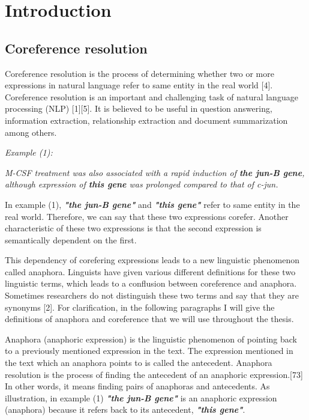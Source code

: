 \chapter{Introduction}
\label{chapter:Introduction}
\section{Coreference resolution}

Coreference resolution is the process of determining whether two or more expressions in natural language refer to same entity in the real world [4]. Coreference resolution is an important and challenging task of natural language processing (NLP) [1][5]. It is believed to be useful in question answering, information extraction, relationship extraction and document summarization among others. \vspace{5mm}
  
\emph{Example (1):}
\begin{changemargin}{10mm}{10mm} 
   \emph{ M-CSF treatment was also associated with a rapid induction of \textbf{the jun-B gene}, although expression of \textbf{this gene} was prolonged compared to that of c-jun.}          
   \vspace{5mm} 
\end{changemargin} 

In example (1), \emph{\textbf{ "the jun-B gene"}} and \emph{ \textbf{"this gene"}} refer to same entity in the real world. Therefore, we can say that these two expressions corefer. Another characteristic of these two expressions is that the second expression is semantically dependent on the first.

This dependency of corefering expressions leads to a new linguistic phenomenon called anaphora. Linguists have given various different definitions for these two linguistic terms, which leads to a conflusion between coreference and anaphora. Sometimes researchers do not distinguish these two terms and say that they are synonyms [2]. For clarification, in the following paragraphs I will give the definitions of anaphora and coreference that we will use throughout the thesis.
  
Anaphora (anaphoric expression) is the linguistic phenomenon of pointing back to a previously mentioned expression in the text. The expression mentioned in the text which an anaphora points to is called the antecedent. Anaphora resolution is the process of finding the antecedent of an anaphoric expression.[73] In other words, it means finding pairs of anaphoras and antecedents. As illustration, in example (1) \emph{\textbf{ "the jun-B gene"}} is an anaphoric expression (anaphora) because it refers back to its antecedent, \emph{ \textbf{"this gene"}}. 

